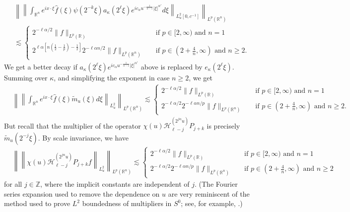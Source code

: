 \documentclass[12pt,leqno]{amsart}
\def\R{\mathbb{R}}
\def\Z{\mathbb{Z}}
\theoremstyle{plain}
\numberwithin{equation}{section}
\begin{document}
\begin{equation} \label{eq:square_fcn_Sect4}
\begin{split}
& \left\|  \left\|  \int_{\R^n} e^{i x \cdot \xi} \widehat{f}(\xi) \psi(2^{-k} \xi) a_{\kappa}(2^{\ell} \xi) e^{i c_{\alpha} u^{-\frac{1}{\alpha-1}} |\xi|^{\alpha'}} d\xi \right\|_{L^2_u [0,c^{-1}]} \right\|_{L^p(\R^n)} \\
& \lesssim 
\begin{cases}
2^{-\ell \alpha/2} \|f\|_{L^p(\R)} &\quad \text{if $p \in [2,\infty)$ and $n = 1$} \\
2^{\ell \alpha \left[n \left( \frac{1}{2}-\frac{1}{p} \right) - \frac{1}{2} \right]} 2^{-\ell \alpha n/2} \|f\|_{L^p(\R^n)} 
&\quad \text{if $p \in ( 2+\frac{4}{n}, \infty) $ and $n \geq 2$}.
\end{cases}
\end{split}
\end{equation}
We get a better decay if $a_{\kappa}(2^{\ell} \xi) e^{i c_{\alpha} u^{-\frac{1}{\alpha-1}} |\xi|^{\alpha'}}$ above is replaced by $e_{\kappa}(2^{\ell} \xi)$. Summing over $\kappa$, and simplifying the exponent in case $n \geq 2$, we get
\[ 
\begin{split}
& \left\|  \left\|  \int_{\R^n} e^{i x \cdot \xi} \widehat{f}(\xi) \tilde{m}_u(\xi) d\xi \right\|_{L^2_u} \right\|_{L^p(\R^n)} \lesssim 
\begin{cases}
2^{-\ell \alpha/2} \|f\|_{L^p(\R)} &\quad \text{if $p \in [2,\infty)$ and $n = 1$} \\
2^{-\ell \alpha/2} 2^{-\ell \alpha n/p}  \|f\|_{L^p(\R^n)}
&\quad \text{if $p \in ( 2+\frac{4}{n}, \infty)$ and $n \geq 2$}.
\end{cases}
\end{split}
\]
But recall that the multiplier of the operator $\chi(u) \mathcal{H}^{(2^{j \alpha} u)}_{\ell-j} P_{j+k}$ is precisely $\tilde{m}_u(2^{-j} \xi)$. By scale invariance, we have
\begin{equation} \label{eq:square_fcn_3}
\begin{split}
& \left\|  \left\|  \chi(u) \mathcal{H}^{(2^{j \alpha} u)}_{\ell-j} P_{j+k} f \right\|_{L^2_u} \right\|_{L^p(\R^n)}  \lesssim 
\begin{cases}
2^{-\ell \alpha/2} \|f\|_{L^p(\R)} &\quad \text{if $p \in [2,\infty)$ and $n = 1$} \\
2^{-\ell \alpha/2} 2^{-\ell \alpha n/p}  \|f\|_{L^p(\R^n)} 
&\quad \text{if $p \in ( 2+\frac{4}{n}, \infty)$ and $n \geq 2$} 
\end{cases}
\end{split}
\end{equation}
for all $j \in \Z$, where the implicit constants are independent of $j$. (The Fourier series expansion used to remove the dependence on $u$ are very reminiscent of the method used to prove $L^2$ boundedness of multipliers in $S^0$; see, for example, \cite[Chapter VI.2]{MR1232192}.)
\end{document}
